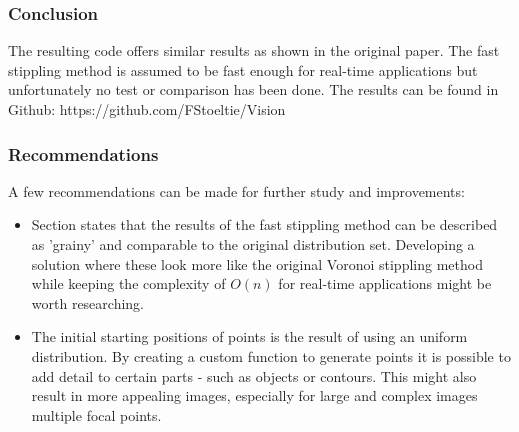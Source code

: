 \subsubsection{Conclusion}
The resulting code offers similar results as shown in the original paper. The fast stippling method is assumed to be fast enough for real-time applications but unfortunately no test or comparison has been done. The results can be found in Github: https://github.com/FStoeltie/Vision

\subsubsection{Recommendations}
A few recommendations can be made for further study and improvements:


\begin{itemize}
  \item Section  states that the results of the fast stippling method can be described as 'grainy' and comparable to the original distribution set. Developing a solution where these look more like the original Voronoi stippling method while keeping the complexity of \(O(n)\) for real-time applications might be worth researching. 
  \item The initial starting positions of points is the result of using an uniform distribution. By creating a custom function to generate points it is possible to add detail to certain parts - such as objects or contours. This might also result in more appealing images, especially for large and complex images multiple focal points. 
\end{itemize}